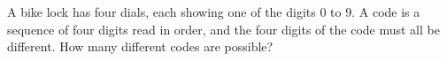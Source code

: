 A bike lock has four dials, each showing one of the digits $0$ to $9$. A code is a sequence of four digits read in order, and the four digits of the code must all be different. How many different codes are possible?
